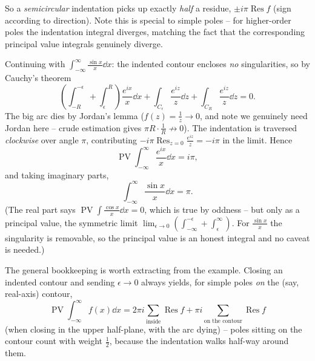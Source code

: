 \documentclass[a4paper]{scrartcl}
\newcommand{\Res}{\operatorname*{Res}}
\newcommand{\pv}{\operatorname{PV}}
\begin{document}
So a \emph{semicircular} indentation picks up exactly \emph{half} a residue, $\pm i\pi \Res f$ (sign according to direction). Note this is special to simple poles -- for higher-order poles the indentation integral diverges, matching the fact that the corresponding principal value integrals genuinely diverge.

\begin{example}
	Continuing with $\int_{-\infty}^\infty \frac{\sin x}{x} \dd x$: the indented contour encloses \emph{no} singularities, so by Cauchy's theorem
	$$
	\left(\int_{-R}^{-\epsilon} + \int_\epsilon^R\right) \frac{e^{ix}}{x} \dd x + \int_{C_\epsilon} \frac{e^{iz}}{z} \dd z + \int_{C_R} \frac{e^{iz}}{z} \dd z = 0.
	$$
	The big arc dies by Jordan's lemma ($f(z) = \frac 1z \to 0$, and note we genuinely need Jordan here -- crude estimation gives $\pi R \cdot \frac 1R \not\to 0$). The indentation is traversed \emph{clockwise} over angle $\pi$, contributing $-i\pi \Res_{z=0} \frac{e^{iz}}{z} = -i\pi$ in the limit. Hence
	$$
	\pv \int_{-\infty}^\infty \frac{e^{ix}}{x} \dd x = i\pi,
	$$
	and taking imaginary parts,
	$$
	\int_{-\infty}^\infty \frac{\sin x}{x} \dd x = \pi.
	$$
	(The real part says $\pv \int \frac{\cos x}{x} \dd x = 0$, which is true by oddness -- but only as a principal value, the symmetric limit $\lim_{\epsilon \to 0} (\int_{-\infty}^{-\epsilon} + \int_\epsilon^\infty)$. For $\frac{\sin x}{x}$ the singularity is removable, so the principal value is an honest integral and no caveat is needed.)
\end{example}

The general bookkeeping is worth extracting from the example. Closing an indented contour and sending $\epsilon \to 0$ always yields, for simple poles \emph{on} the (say, real-axis) contour,
$$
\pv \int_{-\infty}^\infty f(x) \dd x = 2\pi i \sum_{\text{inside}} \Res f + \pi i \sum_{\text{on the contour}} \Res f
$$
(when closing in the upper half-plane, with the arc dying) -- poles sitting on the contour count with weight $\frac 12$, because the indentation walks half-way around them.
\end{document}
